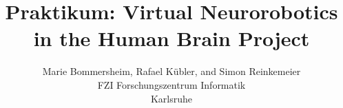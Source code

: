 \documentclass[10pt,twocolumn,letterpaper]{article}
\begin{document}
\title{Praktikum: Virtual Neurorobotics in the Human Brain Project}

\author{Marie Bommersheim, Rafael K\"ubler, and Simon Reinkemeier\\
FZI Forschungszentrum Informatik\\
Karlsruhe\\
}

\maketitle

\begin{abstract}

\end{abstract}








{\small


}
\end{document}
